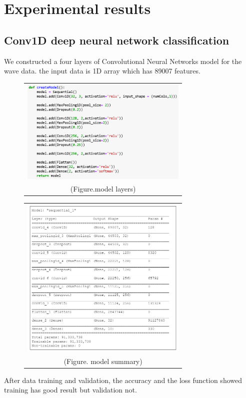 \documentclass{article}
\begin{document}
\section{Experimental results}

\subsection{Conv1D deep neural network classification}
We constructed a four layers of Convolutional Neural Networks model for the wave data. the input data is 1D array which has 89007 features.
\begin{figure}[!htb]
    \begin{tabular}{c}
        \includegraphics[width=8cm]{pic/CNN_Create.png}\\
    (Figure.model layers)
    \end{tabular}
\end{figure}
\begin{figure}[!htb]
    \begin{tabular}{c}
        \includegraphics[width=8cm]{pic/CNN_Sum.png}\\
    (Figure. model summary)
    \end{tabular}
\end{figure}
After data training and validation, the accuracy and the loss function showed training has good result but validation not.
\end{document}
